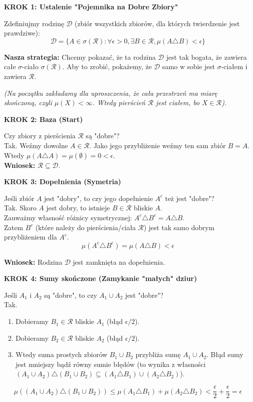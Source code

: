 \textbf{KROK 1: Ustalenie "Pojemnika na Dobre Zbiory"}

Zdefiniujmy rodzinę $\mathcal{D}$ (zbiór wszystkich zbiorów, dla których twierdzenie jest prawdziwe):
\[ \mathcal{D} = \{ A \in \sigma(\mathcal{R}) : \forall \epsilon > 0, \exists B \in \mathcal{R}, \mu(A \triangle B) < \epsilon \} \]

\textbf{Nasza strategia:} Chcemy pokazać, że ta rodzina $\mathcal{D}$ jest tak bogata, że zawiera całe $\sigma$-ciało $\sigma(\mathcal{R})$. Aby to zrobić, pokażemy, że $\mathcal{D}$ samo w sobie jest $\sigma$-ciałem i zawiera $\mathcal{R}$.

\textit{(Na początku zakładamy dla uproszczenia, że cała przestrzeń ma miarę skończoną, czyli $\mu(X) < \infty$. Wtedy pierścień $\mathcal{R}$ jest ciałem, bo $X \in \mathcal{R}$)}.

\textbf{KROK 2: Baza (Start)}

Czy zbiory z pierścienia $\mathcal{R}$ są "dobre"?\\
Tak. Weźmy dowolne $A \in \mathcal{R}$. Jako jego przybliżenie weźmy ten sam zbiór $B = A$.\\
Wtedy $\mu(A \triangle A) = \mu(\emptyset) = 0 < \epsilon$.\\
\textbf{Wniosek:} $\mathcal{R} \subseteq \mathcal{D}$.

\textbf{KROK 3: Dopełnienia (Symetria)}

Jeśli zbiór $A$ jest "dobry", to czy jego dopełnienie $A^c$ też jest "dobre"?\\
Tak. Skoro $A$ jest dobry, to istnieje $B \in \mathcal{R}$ bliskie $A$.\\
Zauważmy własność różnicy symetrycznej: $A^c \triangle B^c = A \triangle B$.\\
Zatem $B^c$ (które należy do pierścienia/ciała $\mathcal{R}$) jest tak samo dobrym przybliżeniem dla $A^c$.
\[ \mu(A^c \triangle B^c) = \mu(A \triangle B) < \epsilon \]

\textbf{Wniosek:} Rodzina $\mathcal{D}$ jest zamknięta na dopełnienia.

\textbf{KROK 4: Sumy skończone (Zamykanie "małych" dziur)}

Jeśli $A_1$ i $A_2$ są "dobre", to czy $A_1 \cup A_2$ jest "dobre"?\\
Tak.
\begin{enumerate}
    \item Dobieramy $B_1 \in \mathcal{R}$ bliskie $A_1$ (błąd $\epsilon/2$).
    \item Dobieramy $B_2 \in \mathcal{R}$ bliskie $A_2$ (błąd $\epsilon/2$).
    \item Wtedy suma prostych zbiorów $B_1 \cup B_2$ przybliża sumę $A_1 \cup A_2$. Błąd sumy jest mniejszy bądź równy sumie błędów (to wynika z własności $(A_1 \cup A_2) \triangle (B_1 \cup B_2) \subseteq (A_1 \triangle B_1) \cup (A_2 \triangle B_2)$).
\end{enumerate}
\[ \mu((A_1 \cup A_2) \triangle (B_1 \cup B_2)) \le \mu(A_1 \triangle B_1) + \mu(A_2 \triangle B_2) < \frac{\epsilon}{2} + \frac{\epsilon}{2} = \epsilon \]

